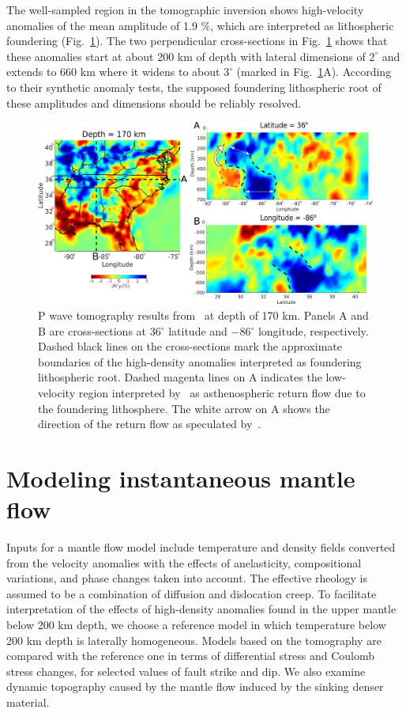 \documentclass[draft,linenumbers]{agujournal2018}
\begin{document}
    The well-sampled region in the tomographic inversion shows
    high-velocity anomalies of the mean amplitude of 1.9 \%, which are interpreted as lithospheric foundering (Fig.~\ref{fig_tomo}). The two perpendicular cross-sections in Fig.~\ref{fig_tomo} shows that these anomalies start at about 200 km of depth with lateral dimensions of $2^\circ$ and extends to 660 km where it widens to about $3^\circ$ (marked in Fig.~\ref{fig_tomo}A). According to their synthetic anomaly tests, the supposed foundering lithospheric root of these amplitudes and dimensions should be reliably resolved.
%
\begin{figure}[ht]
    \centering
    \includegraphics[width=\linewidth]{figures/figure_tomography.png}
    \caption{P wave tomography results from~\citep{Biryol_2016} at depth of 170 km. Panels A and B are cross-sections at 36$^\circ$ latitude and $-$86$^{\circ}$ longitude, respectively. Dashed black lines on the cross-sections mark the approximate boundaries of the high-density anomalies interpreted as foundering lithospheric root. Dashed magenta lines on A indicates the low-velocity region interpreted by~\citet{Biryol_2016} as asthenospheric return flow due to the foundering lithosphere. The white arrow on A shows the direction of the return flow as speculated by~\citet{Biryol_2016}.}
    \label{fig_tomo}
 \end{figure}

\section{Modeling instantaneous mantle flow}
    Inputs for a mantle flow model include temperature and density fields converted from the velocity anomalies with the effects of anelasticity, compositional variations, and phase changes taken into account. The effective rheology is assumed to be a combination of diffusion and dislocation creep. To facilitate interpretation of the effects of high-density anomalies found in the upper mantle below 200 km depth, we choose a reference model in which temperature below 200 km depth is laterally homogeneous. Models based on the tomography are compared with the reference one in terms of differential stress and Coulomb stress changes, for selected values of fault strike and dip. We also examine dynamic topography caused by the mantle flow induced by the sinking denser material.
    
\end{document}
